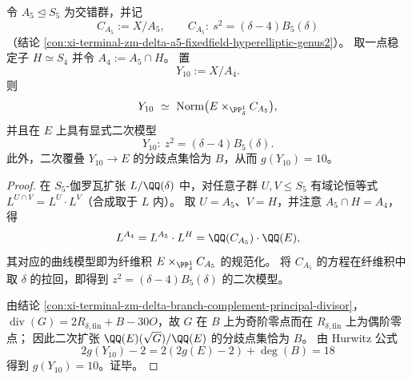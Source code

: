 \begin{conclusion}\label{con:xi-terminal-zm-delta-a4-fiberproduct-y10-explicit}
令 \(A_5\trianglelefteq S_5\) 为交错群，并记
\[
C_{A_5}:=X/A_5,\qquad C_{A_5}:\ s^2=(\delta-4)B_5(\delta)
\]
（结论 \ref{con:xi-terminal-zm-delta-a5-fixedfield-hyperelliptic-genus2}）。
取一点稳定子 \(H\simeq S_4\) 并令 \(A_4:=A_5\cap H\)。
置
\[
Y_{10}:=X/A_4.
\]
则
\[
Y_{10}\ \simeq\ \mathrm{Norm}\bigl(E\times_{\PP^1_\delta} C_{A_5}\bigr),
\]
并且在 \(E\) 上具有显式二次模型
\[
Y_{10}:\ z^2=(\delta-4)B_5(\delta).
\]
此外，二次覆叠 \(Y_{10}\to E\) 的分歧点集恰为 \(B\)，从而 \(g(Y_{10})=10\)。
\end{conclusion}
\begin{proof}
在 \(S_5\)-伽罗瓦扩张 \(L/\QQ(\delta)\) 中，对任意子群 \(U,V\le S_5\) 有域论恒等式
\(
L^{U\cap V}=L^{U}\cdot L^{V}
\)（合成取于 \(L\) 内）。
取 \(U=A_5\)、\(V=H\)，并注意 \(A_5\cap H=A_4\)，得
\[
L^{A_4}=L^{A_5}\cdot L^{H}=\QQ(C_{A_5})\cdot \QQ(E),
\]
其对应的曲线模型即为纤维积 \(E\times_{\PP^1_\delta} C_{A_5}\) 的规范化。
将 \(C_{A_5}\) 的方程在纤维积中取 \(\delta\) 的拉回，即得到 \(z^2=(\delta-4)B_5(\delta)\) 的二次模型。
\par
由结论 \ref{con:xi-terminal-zm-delta-branch-complement-principal-divisor}，
\(
\operatorname{div}(G)=2R_{\delta,\mathrm{fin}}+B-30O
\)，故 \(G\) 在 \(B\) 上为奇阶零点而在 \(R_{\delta,\mathrm{fin}}\) 上为偶阶零点；
因此二次扩张 \(\QQ(E)(\sqrt{G})/\QQ(E)\) 的分歧点集恰为 \(B\)。
由 Hurwitz 公式
\[
2g(Y_{10})-2=2(2g(E)-2)+\deg(B)=18
\]
得到 \(g(Y_{10})=10\)。证毕。
\end{proof}

